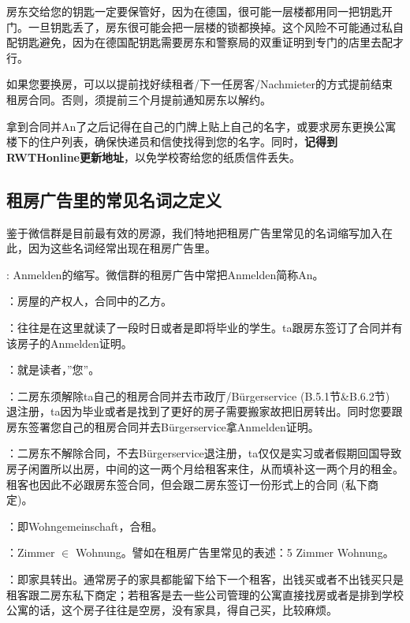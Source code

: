     房东交给您的钥匙一定要保管好，因为在德国，很可能一层楼都用同一把钥匙开门。一旦钥匙丢了，房东很可能会把一层楼的锁都换掉。这个风险不可能通过私自配钥匙避免，因为在德国配钥匙需要房东和警察局的双重证明到专门的店里去配才行。

    如果您要换房，可以以提前找好续租者/下一任房客/Nachmieter的方式提前结束租房合同。否则，须提前三个月提前通知房东以解约。

    拿到合同并An了之后记得在自己的门牌上贴上自己的名字，或要求房东更换公寓楼下的住户列表，确保快递员和信使找得到您的名字。同时，\textbf{记得到RWTHonline更新地址}，以免学校寄给您的纸质信件丢失。

  \subsection{租房广告里的常见名词之定义}

    鉴于微信群是目前最有效的房源，我们特地把租房广告里常见的名词缩写加入在此，因为这些名词经常出现在租房广告里。

    : Anmelden的缩写。微信群的租房广告中常把Anmelden简称An。

    ：房屋的产权人，合同中的乙方。

    ：往往是在这里就读了一段时日或者是即将毕业的学生。ta跟房东签订了合同并有该房子的Anmelden证明。

    ：就是读者，”您”。

    ：二房东须解除ta自己的租房合同并去市政厅/Bürgerservice (B.5.1节\&B.6.2节) 退注册，ta因为毕业或者是找到了更好的房子需要搬家故把旧房转出。同时您要跟房东签署您自己的租房合同并去Bürgerservice拿Anmelden证明。

    ：二房东不解除合同，不去Bürgerservice退注册，ta仅仅是实习或者假期回国导致房子闲置所以出房，中间的这一两个月给租客来住，从而填补这一两个月的租金。租客也因此不必跟房东签合同，但会跟二房东签订一份形式上的合同 (私下商定)。

    ：即Wohngemeinschaft，合租。

    ：Zimmer $\in$ Wohnung。譬如在租房广告里常见的表述：5 Zimmer Wohnung。

    ：即家具转出。通常房子的家具都能留下给下一个租客，出钱买或者不出钱买只是租客跟二房东私下商定；若租客是去一些公司管理的公寓直接找房或者是排到学校公寓的话，这个房子往往是空房，没有家具，得自己买，比较麻烦。

